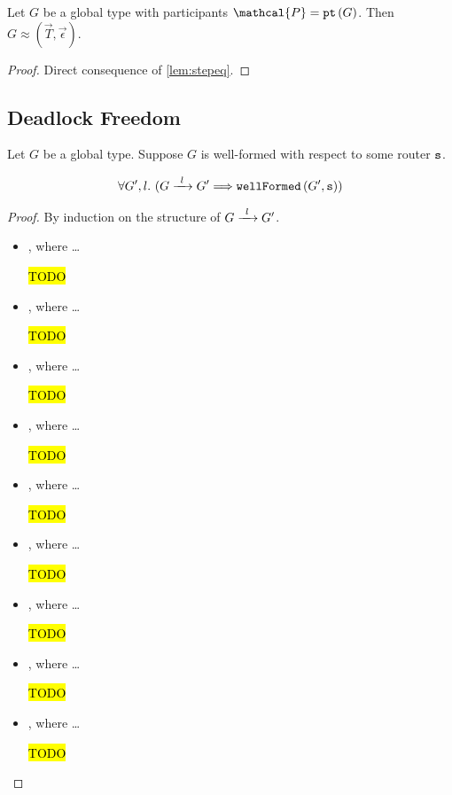 \begin{theorem}
Let $G$ be a global type with participants 
$\mathcal{P} = \pt{G}$.
Then $G \approx (\vec T, \vec \epsilon)$.

\label{th:traceeq}
\end{theorem}

\begin{proof}
Direct consequence of \cref{lem:stepeq}.
\end{proof}

\subsection{Deadlock Freedom}
\label{subsection:newdeadlockfreedom}

\begin{lemma}
Let $G$ be a global type.
Suppose $G$ is well-formed with respect to some router ${\mathtt{s}}$.

\[
\forall G', l. ~
(\treduce{G}{G'}{l}
	\Longrightarrow
\wfnew{G'}{s})
\]

\label{lem:preservewf}
\end{lemma}

\begin{proof}
By induction on the structure of $\treduce{G}{G'}{l}$.

\begin{itemize}
\item {}, where \dots

\hl{TODO}

\item {}, where \dots

\hl{TODO}

\item {}, where \dots

\hl{TODO}

\item {}, where \dots

\hl{TODO}

\item {}, where \dots

\hl{TODO}

\item {}, where \dots

\hl{TODO}

\item {}, where \dots

\hl{TODO}

\item {}, where \dots

\hl{TODO}

\item {}, where \dots

\hl{TODO}
\end{itemize}

\end{proof}

